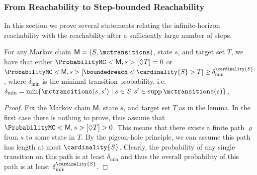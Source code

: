 \documentclass{theoretics}
\newcommand{\MC}{\mathsf{M}}
\newcommand{\States}{S}
\newcommand{\finitepath}{\varrho}
\DeclareMathOperator{\support}{supp}
\newcommand{\reach}{\Diamond}
\newcommand{\targetset}{T}
\begin{document}
\subsubsection*{From Reachability to Step-bounded Reachability}
In this section we prove several statements relating the infinite-horizon reachability with the reachability after a sufficiently large number of steps.
\begin{lemma} \label{stm:markov_chain_minimum_reachability}
	For any Markov chain $\MC = (\States, \mctransitions)$, state $s$, and target set $\targetset$, we have that either $\ProbabilityMC<\MC, s>[\reach \targetset] = 0$ or $\ProbabilityMC<\MC, s>[\boundedreach<\cardinality{\States}> \targetset] \geq \delta_{\min}^{\cardinality{\States}}$, where $\delta_{\min}$ is the minimal transition probability, i.e.\ $\delta_{\min} = \min \{ \mctransitions(s, s') \mid s \in \States, s' \in \support \mctransitions(s) \}$.
\end{lemma}
\begin{proof}
	Fix the Markov chain $\MC$, state $s$, and target set $\targetset$ as in the lemma.
	In the first case there is nothing to prove, thus assume that $\ProbabilityMC<\MC, s>[\reach \targetset] > 0$.
	This means that there exists a finite path $\finitepath$ from $s$ to some state in $\targetset$.
	By the pigeon-hole principle, we can assume this path has length at most $\cardinality{\States}$.
	Clearly, the probability of any single transition on this path is at least $\delta_{\min}$ and thus the overall probability of this path is at least $\delta_{\min}^{\cardinality{\States}}$. 
\end{proof}
\end{document}
